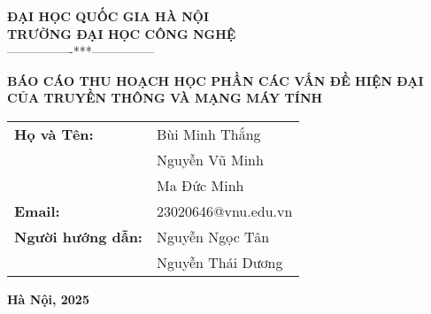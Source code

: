 
\begin{titlepage}
    \begin{center}
        \large\textbf{ĐẠI HỌC QUỐC GIA HÀ NỘI}\\
        \large\textbf{TRƯỜNG ĐẠI HỌC CÔNG NGHỆ}\\
        ----------------***---------------

        \vspace{3cm}
        {\large\textbf{BÁO CÁO THU HOẠCH HỌC PHẦN CÁC VẤN ĐỀ HIỆN ĐẠI CỦA TRUYỀN THÔNG VÀ MẠNG MÁY TÍNH}}

        \vspace{3cm}
        {\huge\textbf{}}

        \vfill
        \begin{table}[h]
            \centering
            \large
            \begin{tabular}{ll}
                \textbf{Họ và Tên:} & Bùi Minh Thắng \\
                \textbf{          } & Nguyễn Vũ Minh \\
                \textbf{          } & Ma Đức Minh \\
                \textbf{Email:} & 23020646@vnu.edu.vn \\
                \textbf{Người hướng dẫn:} & Nguyễn Ngọc Tân \\
                \textbf{                } & Nguyễn Thái Dương \\
            \end{tabular}
        \end{table}

        \vspace{4cm}
        \textbf{Hà Nội, 2025}
        
    \end{center}
\end{titlepage}